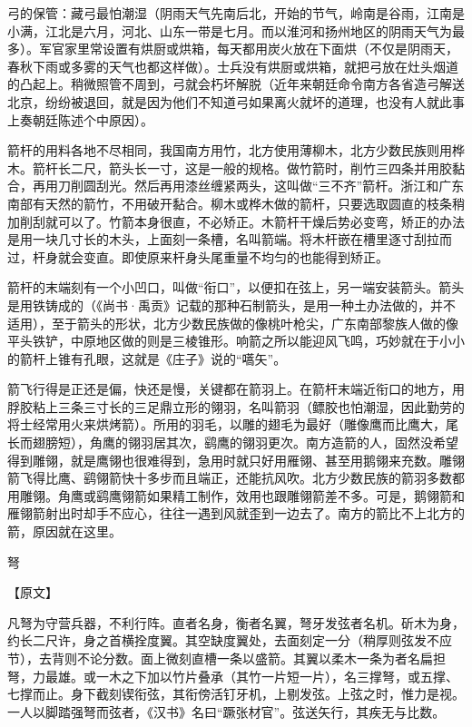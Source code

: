 \documentclass[12pt,UTF8]{ctexbook}
\begin{document}
弓的保管：藏弓最怕潮湿（阴雨天气先南后北，开始的节气，岭南是谷雨，江南是小满，江北是六月，河北、山东一带是七月。而以淮河和扬州地区的阴雨天气为最多）。军官家里常设置有烘厨或烘箱，每天都用炭火放在下面烘（不仅是阴雨天，春秋下雨或多雾的天气也都这样做）。士兵没有烘厨或烘箱，就把弓放在灶头烟道的凸起上。稍微照管不周到，弓就会朽坏解脱（近年来朝廷命令南方各省造弓解送北京，纷纷被退回，就是因为他们不知道弓如果离火就坏的道理，也没有人就此事上奏朝廷陈述个中原因）。

箭杆的用料各地不尽相同，我国南方用竹，北方使用薄柳木，北方少数民族则用桦木。箭杆长二尺，箭头长一寸，这是一般的规格。做竹箭时，削竹三四条并用胶黏合，再用刀削圆刮光。然后再用漆丝缠紧两头，这叫做“三不齐”箭杆。浙江和广东南部有天然的箭竹，不用破开黏合。柳木或桦木做的箭杆，只要选取圆直的枝条稍加削刮就可以了。竹箭本身很直，不必矫正。木箭杆干燥后势必变弯，矫正的办法是用一块几寸长的木头，上面刻一条槽，名叫箭端。将木杆嵌在槽里逐寸刮拉而过，杆身就会变直。即使原来杆身头尾重量不均匀的也能得到矫正。

箭杆的末端刻有一个小凹口，叫做“衔口”，以便扣在弦上，另一端安装箭头。箭头是用铁铸成的（《尚书·禹贡》记载的那种石制箭头，是用一种土办法做的，并不适用），至于箭头的形状，北方少数民族做的像桃叶枪尖，广东南部黎族人做的像平头铁铲，中原地区做的则是三棱锥形。响箭之所以能迎风飞鸣，巧妙就在于小小的箭杆上锥有孔眼，这就是《庄子》说的“嚆矢”。

箭飞行得是正还是偏，快还是慢，关键都在箭羽上。在箭杆末端近衔口的地方，用脬胶粘上三条三寸长的三足鼎立形的翎羽，名叫箭羽（鳔胶也怕潮湿，因此勤劳的将士经常用火来烘烤箭）。所用的羽毛，以雕的翅毛为最好（雕像鹰而比鹰大，尾长而翅膀短），角鹰的翎羽居其次，鹞鹰的翎羽更次。南方造箭的人，固然没希望得到雕翎，就是鹰翎也很难得到，急用时就只好用雁翎、甚至用鹅翎来充数。雕翎箭飞得比鹰、鹞翎箭快十多步而且端正，还能抗风吹。北方少数民族的箭羽多数都用雕翎。角鹰或鹞鹰翎箭如果精工制作，效用也跟雕翎箭差不多。可是，鹅翎箭和雁翎箭射出时却手不应心，往往一遇到风就歪到一边去了。南方的箭比不上北方的箭，原因就在这里。

弩

【原文】

凡弩为守营兵器，不利行阵。直者名身，衡者名翼，弩牙发弦者名机。斫木为身，约长二尺许，身之首横拴度翼。其空缺度翼处，去面刻定一分（稍厚则弦发不应节），去背则不论分数。面上微刻直槽一条以盛箭。其翼以柔木一条为者名扁担弩，力最雄。或一木之下加以竹片叠承（其竹一片短一片），名三撑弩，或五撑、七撑而止。身下截刻锲衔弦，其衔傍活钉牙机，上剔发弦。上弦之时，惟力是视。一人以脚踏强弩而弦者，《汉书》名曰“蹶张材官”。弦送矢行，其疾无与比数。
\end{document}
